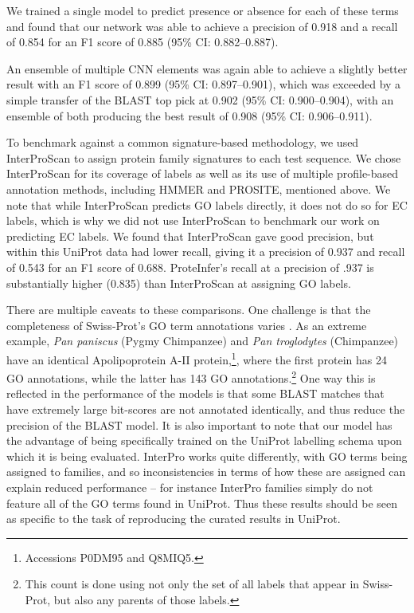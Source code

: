 
We trained a single model to predict presence or absence for each of these terms and found that our network was able to achieve a precision of 0.918 and a recall of 0.854 for an F1 score of 0.885 (95\% CI: 0.882--0.887).

An ensemble of multiple CNN elements was again able to achieve a slightly better result with an F1 score of 0.899 (95\% CI: 0.897--0.901), which was exceeded by a simple transfer of the BLAST top pick at 0.902 (95\% CI: 0.900--0.904), with an ensemble of both producing the best result of 0.908 (95\% CI: 0.906--0.911). 

To benchmark against a common signature-based methodology, we used InterProScan to assign protein family signatures to each test sequence. We chose InterProScan for its coverage of labels as well as its use of multiple profile-based annotation methods, including HMMER and PROSITE, mentioned above. We note that while InterProScan predicts GO labels directly, it does not do so for EC labels, which is why we did not use InterProScan to benchmark our work on predicting EC labels. We found that InterProScan gave good precision, but within this UniProt data had lower recall, giving it a precision of 0.937 and recall of 0.543 for an F1 score of 0.688. ProteInfer's recall at a precision of .937 is substantially higher (0.835) than InterProScan at assigning GO labels.  

There are multiple caveats to these comparisons. One challenge is that the completeness of Swiss-Prot's GO term annotations varies \cite{jiang2014impact}. As an extreme example, \textit{Pan paniscus} (Pygmy Chimpanzee) and \textit{Pan troglodytes} (Chimpanzee) have an identical Apolipoprotein A-II protein,\footnote{Accessions P0DM95 and Q8MIQ5.}, where the first protein has 24 GO annotations, while the latter has 143 GO annotations.\footnote{This count is done using not only the set of all labels that appear in Swiss-Prot, but also any parents of those labels.} One way this is reflected in the performance of the models is that some BLAST matches that have extremely large bit-scores are not annotated identically, and thus reduce the precision of the BLAST model. It is also important to note that our model has the advantage of being specifically trained on the UniProt labelling schema upon which it is being evaluated. InterPro works quite differently, with GO terms being assigned to families, and so inconsistencies in terms of how these are assigned can explain reduced performance -- for instance InterPro families simply do not feature all of the GO terms found in UniProt. Thus these results should be seen as specific to the task of reproducing the curated results in UniProt.

